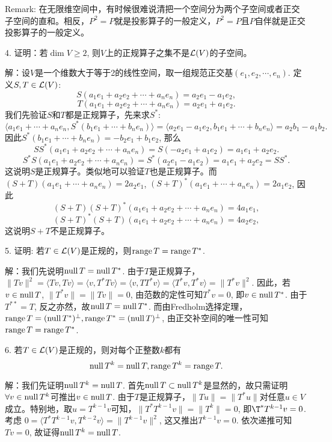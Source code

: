 \documentclass[hyperref,]{ctexart}
\begin{document}
\smallskip

\noindent{} Remark:
在无限维空间中，有时候很难说清把一个空间分为两个子空间或者正交子空间的直和。相反，\(P^2=P\)就是投影算子的一般定义，\(P^2=P\)且\(P\)自伴就是正交投影算子的一般定义。

\bigskip

\noindent{} 4. 证明：若\(\dim V\ge 2\),
则\(V\)上的正规算子之集不是\(\mathcal{L}(V)\)的子空间。

\smallskip

\noindent{}
解：设\(V\)是一个维数大于等于2的线性空间，取一组规范正交基\((e_1,e_2,\cdots,e_n)\).
定义\(S,T\in\mathcal{L}(V)\):
\[S(a_1e_1+a_2e_2+\cdots+a_ne_n) = a_2e_1-a_1e_2,\]
\[T(a_1e_1+a_2e_2+\cdots+a_ne_n) = a_2e_1+a_1e_2.\]
我们先验证\(S\)和\(T\)都是正规算子，先来求\(S^*\):
\[\langle a_1e_1+\cdots+a_ne_n,S^*(b_1e_1+\cdots+b_ne_n)\rangle =\langle a_2e_1-a_1e_2,b_1e_1+\cdots+b_ne_n\rangle=a_2b_1-a_1b_2.\]
因此\(S^*(b_1e_1+\cdots+b_ne_n)=-b_2e_1+b_1e_2\), 那么
\[SS^*(a_1e_1+a_2e_2+\cdots+a_ne_n)=S(-a_2e_1+a_1e_2)= a_1e_1+a_2e_2.\]
\[S^*S(a_1e_1+a_2e_2+\cdots+a_ne_n)=S^*(a_2e_1-a_1e_2)= a_1e_1+a_2e_2=SS^*.\]
这说明\(S\)是正规算子。类似地可以验证\(T\)也是正规算子。而\((S+T)(a_1e_1+\cdots+a_ne_n) = 2a_2e_1\),
\((S+T)^*(a_1e_1+\cdots+a_ne_n) =2a_1e_2\), 因此
\[(S+T)(S+T)^*(a_1e_1+a_2e_2+\cdots+a_ne_n)=4a_1e_1,\]
\[(S+T)^*(S+T)(a_1e_1+a_2e_2+\cdots+a_ne_n)=4a_2e_2,\]
这说明\(S+T\)不是正规算子。

\bigskip

\noindent{} 5. 证明:
若\(T\in\mathcal{L}(V)\)是正规的，则\(\mathrm{range}\, T=\mathrm{range}\, T^*\).

\smallskip

\noindent{} 解：我们先说明\(\mathrm{null}\, T=\mathrm{null}\, T^*\).
由于\(T\)是正规算子，\(\|Tv\|^2=\langle Tv,Tv\rangle = \langle v,T^*Tv\rangle = \langle v,TT^*v\rangle=\langle T^*v,T^*v\rangle =\|T^*v\|^2\).
因此，若\(v\in\mathrm{null}\, T\), \(\|T^*v\| =\|Tv\|=0\),
由范数的定性可知\(T^*v=0\), 即\(v\in\mathrm{null}\, T^*\). 由于\(T^{**}=T\),
反之亦然，故\(\mathrm{null}\, T=\mathrm{null}\, T^*\).
而由Fredholm选择定理，\(\mathrm{range}\, T=(\mathrm{null}\, T^*)^\perp,\mathrm{range}\, T^*=(\mathrm{null}\, T)^\perp\),
由正交补空间的唯一性可知\(\mathrm{range}\, T =\mathrm{range}\, T^*\).

\bigskip

\noindent{} 6. 若\(T\in\mathcal{L}(V)\)是正规的，则对每个正整数\(k\)都有
\[\mathrm{null}\, T^k=\mathrm{null}\, T,\mathrm{range}\, T^k=\mathrm{range}\, T.\]

\smallskip

\noindent{} 解：我们先证明\(\mathrm{null}\, T^k=\mathrm{null}\, T\).
首先\(\mathrm{null}\, T\subset \mathrm{null}\, T^k\)是显然的，故只需证明\(\forall v\in\mathrm{null}\, T^k\)可推出\(v\in\mathrm{null}\, T\).
由于\(T\)是正规算子，\(\|Tu\|=\|T^*u\|\)对任意\(u\in V\)成立。特别地，取\(u=T^{k-1}v\)可知，\(\|T^*T^{k-1}v\|=\|T^k\|=0\),
即\(\T^*T^{k-1}v=0\). 考虑
\(0=\langle T^*T^{k-1}v,T^{k-2}v\rangle=\|T^{k-1}v\|^2\),
这又推出\(T^{k-1}v=0\). 依次递推可知\(Tv=0\),
故证得\(\mathrm{null}\, T^k= \mathrm{null}\, T\).
\end{document}

